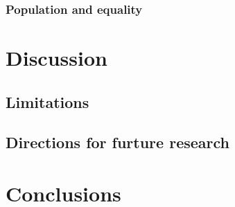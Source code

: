 \documentclass[preprint, 3p,
authoryear]{elsarticle} %
\begin{document}
\subsubsection{Population and equality}\label{population-and-equality}

\section{Discussion}\label{discussion}

\subsection{Limitations}\label{limitations}

\subsection{Directions for furture
research}\label{directions-for-furture-research}

\section{Conclusions}\label{conclusions}

\renewcommand\refname{References}

\end{document}
